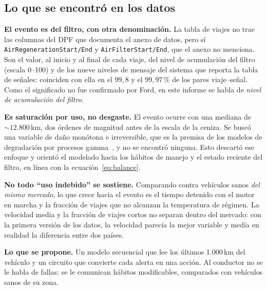 \subsection{Lo que se encontró en los datos}

\textbf{El evento es del filtro, con otra denominación.} La tabla de viajes no trae las columnas del DPF que documenta el
anexo de datos, pero sí \texttt{AirRegenerationStart/End} y \texttt{AirFilterStart/End}, que el anexo no menciona. Son el
valor, al inicio y al final de cada viaje, del nivel de acumulación del filtro (escala 0--100) y de los nueve niveles de
mensaje del sistema que reporta la tabla de señales: coinciden con ella en el $99{,}8$ y el $99{,}97\,\%$ de los pares
viaje--señal. Como el significado no fue confirmado por Ford, en este informe se habla de \emph{nivel de acumulación del
filtro}.

\textbf{Es saturación por uso, no desgaste.} El evento ocurre con una mediana de $\sim 12.800$\,km, dos órdenes de
magnitud antes de la escala de la ceniza. Se buscó una variable de daño monótona e irreversible, que es la premisa de los
modelos de degradación por procesos gamma~\cite{vannoortwijk2009}, y no se encontró ninguna. Esto descartó ese enfoque y
orientó el modelado hacia los hábitos de manejo y el estado reciente del filtro, en línea con la ecuación~\eqref{eq:balance}.

\textbf{No todo ``uso indebido'' se sostiene.} Comparando contra vehículos sanos \emph{del mismo mercado}, lo que crece hacia
el evento es el tiempo detenido con el motor en marcha y la fracción de viajes que no alcanzan la temperatura de régimen. La
velocidad media y la fracción de viajes cortos no separan dentro del mercado: con la primera versión de los datos, la velocidad
parecía la mejor variable y medía en realidad la diferencia entre dos países.

\textbf{Lo que se propone.} Un modelo secuencial que lee los últimos 1.000\,km del vehículo y un circuito que convierte
cada alerta en una acción. Al conductor no se le habla de fallas: se le comunican hábitos modificables, comparados con
vehículos sanos de su zona.
